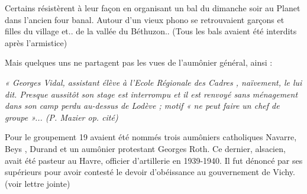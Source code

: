 Certains résistèrent à leur façon en organisant un bal du dimanche soir au Planet dans l’ancien four
banal. Autour d’un vieux phono se retrouvaient garçons et filles du village et.. de la vallée du
Béthuzon.. (Tous les bals avaient été interdits après l’armistice)

Mais quelques uns ne partagent pas les vues de l’aumônier général, ainsi :

\emph{« Georges Vidal, assistant élève à l’Ecole Régionale des Cadres , naïvement, le lui dit. Presque
aussitôt son stage est interrompu et il est renvoyé sans ménagement dans son camp perdu au-dessus
de Lodève ; motif « ne peut faire un chef de groupe »... (P. Mazier op. cité)}

Pour le groupement 19 avaient été nommés trois aumôniers catholiques Navarre,
Beys , Durand et un aumônier protestant Georges Roth. Ce dernier, alsacien, avait été
pasteur au Havre, officier d’artillerie en 1939-1940. Il fut dénoncé par ses supérieurs
pour avoir contesté le devoir d’obéissance au gouvernement de Vichy. (voir lettre jointe)
